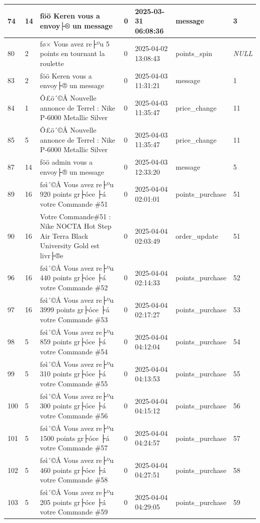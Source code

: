 \begin{longtable}{|l|l|l|l|l|l|l|}
74 & 14 & ­ƒöö Keren vous a envoy├® un message & 0 & 2025-03-31 06:08:36 & message & 3 \\ \hline 
80 & 2 & ­ƒø× Vous avez re├ºu 5 points en tournant la roulette & 0 & 2025-04-02 13:08:43 & points\_spin & \textit{NULL} \\ \hline 
83 & 2 & ­ƒöö Keren vous a envoy├® un message & 0 & 2025-04-03 11:31:21 & message & 1 \\ \hline 
84 & 1 & Ô£ö´©Å Nouvelle annonce de Terrel : Nike P-6000 Metallic Silver & 0 & 2025-04-03 11:35:47 & price\_change & 11 \\ \hline 
85 & 5 & Ô£ö´©Å Nouvelle annonce de Terrel : Nike P-6000 Metallic Silver & 0 & 2025-04-03 11:35:47 & price\_change & 11 \\ \hline 
87 & 14 & ­ƒöö admin vous a envoy├® un message & 0 & 2025-04-03 12:33:20 & message & 5 \\ \hline 
89 & 16 & ­ƒøì´©Å Vous avez re├ºu 920 points gr├óce ├á votre Commande \#51 & 0 & 2025-04-04 02:01:01 & points\_purchase & 51 \\ \hline 
90 & 16 & Votre Commande\#51 : Nike NOCTA Hot Step Air Terra Black University Gold est livr├®e & 0 & 2025-04-04 02:03:49 & order\_update & 51 \\ \hline 
96 & 16 & ­ƒøì´©Å Vous avez re├ºu 440 points gr├óce ├á votre Commande \#52 & 0 & 2025-04-04 02:14:33 & points\_purchase & 52 \\ \hline 
97 & 16 & ­ƒøì´©Å Vous avez re├ºu 3999 points gr├óce ├á votre Commande \#53 & 0 & 2025-04-04 02:17:27 & points\_purchase & 53 \\ \hline 
98 & 5 & ­ƒøì´©Å Vous avez re├ºu 859 points gr├óce ├á votre Commande \#54 & 0 & 2025-04-04 04:12:04 & points\_purchase & 54 \\ \hline 
99 & 5 & ­ƒøì´©Å Vous avez re├ºu 310 points gr├óce ├á votre Commande \#55 & 0 & 2025-04-04 04:13:53 & points\_purchase & 55 \\ \hline 
100 & 5 & ­ƒøì´©Å Vous avez re├ºu 300 points gr├óce ├á votre Commande \#56 & 0 & 2025-04-04 04:15:12 & points\_purchase & 56 \\ \hline 
101 & 5 & ­ƒøì´©Å Vous avez re├ºu 1500 points gr├óce ├á votre Commande \#57 & 0 & 2025-04-04 04:24:57 & points\_purchase & 57 \\ \hline 
102 & 5 & ­ƒøì´©Å Vous avez re├ºu 460 points gr├óce ├á votre Commande \#58 & 0 & 2025-04-04 04:27:51 & points\_purchase & 58 \\ \hline 
103 & 5 & ­ƒøì´©Å Vous avez re├ºu 205 points gr├óce ├á votre Commande \#59 & 0 & 2025-04-04 04:29:05 & points\_purchase & 59 \\ \hline 

\end{longtable}
